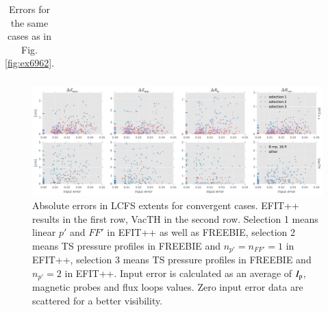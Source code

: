 \begin{table}
\begin{tabular}{lrrrrrrrrrrrrr}

\bottomrule
\end{tabular}
\caption{Errors for the same cases as in Fig. \ref{fig:ex6962}.}
\label{table:ex6962}
\end{table}


\begin{figure}
\centering   %
\hfill{}
\includegraphics[width=18cm]{figures/RZstats.pdf}
\hfill{}
\caption{Absolute errors in LCFS extents for convergent cases. EFIT++ results in the first row, VacTH in the second row. Selection 1 means linear $p'$ and $FF'$ in EFIT++ as well as FREEBIE, selection 2 means TS pressure profiles in FREEBIE and $n_{p'} = n_{FF'} = 1$ in EFIT++, selection 3 means TS pressure profiles in FREEBIE and $n_{p'} = 2$ in EFIT++. Input error is calculated as an average of $I_{\rm{p}}$, magnetic probes and flux loops values. Zero input error data are scattered for a better visibility.}
\label{fig:RZstats}
\end{figure}

